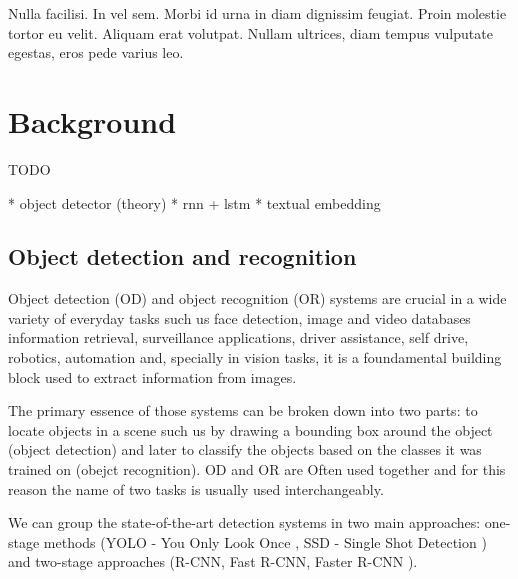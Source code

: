 
\begin{savequote}[75mm]
Nulla facilisi. In vel sem. Morbi id urna in diam dignissim feugiat. Proin molestie tortor eu velit. Aliquam erat volutpat. Nullam ultrices, diam tempus vulputate egestas, eros pede varius leo.
\end{savequote}

\chapter{Background}

TODO

* object detector (theory)
* rnn + lstm
* textual embedding

\section{Object detection and recognition}

Object detection (OD) and object recognition (OR) systems are crucial
in a wide variety of everyday tasks such us face detection, image and
video databases information retrieval, surveillance applications,
driver assistance, self drive, robotics, automation and, specially in
vision tasks, it is a foundamental building block used to extract
information from images.

The primary essence of those systems can be broken down into two
parts: to locate objects in a scene such us by drawing a bounding box
around the object (object detection) and later to classify the objects
based on the classes it was trained on (obejct recognition). OD and OR
are Often used together and for this reason the name of two tasks is
usually used interchangeably.

We can group the state-of-the-art detection systems in two main
approaches: one-stage methods (YOLO - You Only Look Once , SSD - Single Shot Detection ) and two-stage
approaches (R-CNN, Fast R-CNN, Faster R-CNN ).



